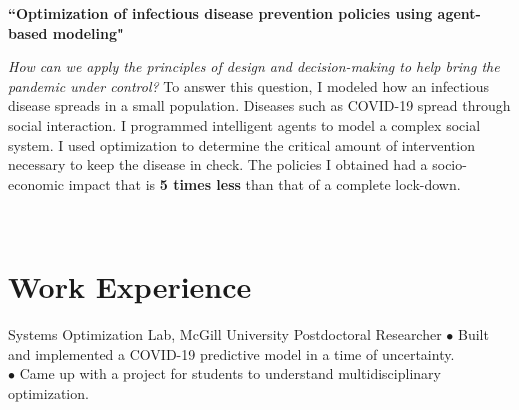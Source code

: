 \documentclass[10pt]{article} %
\begin{document}
\medskip %

{\raggedright\textbf{``Optimization of infectious disease prevention policies using agent-based modeling"}}
\textit{\center How can we apply the principles of design and decision-making to help bring the pandemic under control?}
To answer this question, I modeled how an infectious disease spreads in a small population. Diseases such as COVID-19 spread through social interaction. I programmed intelligent agents to model a complex social system. I used optimization to determine the critical amount of intervention necessary to keep the disease in check. The policies I obtained had a socio-economic impact that is \textbf{5 times less} than that of a complete lock-down.

~~~~

\medskip %


\section{Work Experience}





{} %
{Systems Optimization Lab, McGill University} %
{Postdoctoral Researcher} %
{
	$\bullet$ Built and implemented a COVID-19 predictive model in a time of uncertainty.\\
	$\bullet$ Came up with a project for students to understand multidisciplinary optimization.
} %

\end{document}
